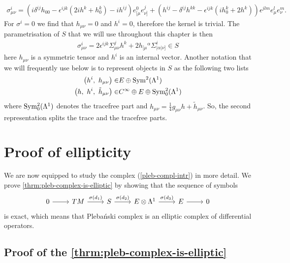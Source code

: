 \documentclass[10pt]{report}
\newcommand{\pleb}[0]{Pleba\'nski}
\theoremstyle{definition}
\begin{document}
\begin{align}
    \sigma^i_{\mu\nu} = \left( i \delta^{ij} h_{00} - \epsilon^{ijk}(2i h^k + h^k_0) - i h^{i j} \right) e^0_{[\mu} e^j_{\nu]} + \left( h^{ij} - \delta^{ij} h^{kk} - \epsilon^{ijk}(i h^k_0 + 2 h^k)\right) \epsilon^{jlm} e^l_\mu e^m_\nu.
\end{align}
For $\sigma^i = 0$ we find that $h_{\mu\nu} = 0$ and $h^i = 0$, therefore the kernel is trivial. The parametrisation of $S$ that we will use throughout this chapter is then
\begin{align}\label{param-sigma}
    \sigma^i_{\mu\nu} =  2 \epsilon^{ijk} \Sigma^j_{\mu\nu} h^k + 2 h_{[\mu}{}^\alpha \Sigma^i_{|\alpha|\nu]} \in S
\end{align}
here $h_{\mu\nu}$ is a symmetric tensor and $h^i$ is an internal vector. Another notation that we will frequently use below is to represent objects in $S$ as the following two lists
\begin{align}
\left( h^i,\ h_{\mu\nu} \right) \in& E \oplus \rm Sym^2(\Lambda^1) \\
\left( h,\ h^i,\ \tilde{h}_{\mu\nu} \right) \in& C^\infty \oplus E \oplus \rm Sym^2_0(\Lambda^1)
\end{align}
where $\rm Sym^2_0(\Lambda^1)$ denotes the tracefree part and $h_{\mu\nu} = \frac{1}{4} g_{\mu\nu} h + \tilde{h}_{\mu\nu}$. So, the second representation splits the trace and the tracefree parts. 

\section{Proof of ellipticity}

We are now equipped to study the complex (\ref{pleb-compl-intr}) in more detail. We prove \cref{thrm:pleb-complex-is-elliptic} by showing that the sequence of symbols 
\begin{equation}
\begin{tikzcd}\label{exact-sequence}
0 \arrow{r}{} & TM  \arrow{r}{\sigma(d_1)} & S  \arrow{r}{\sigma(d_2)} & E\otimes \Lambda^1  \arrow{r}{\sigma(d_3)} & E \arrow{r}{} & 0
\end{tikzcd}
\end{equation}
is exact, which means that \pleb{} complex is an elliptic complex of differential operators. 

\subsection{Proof of the \cref{thrm:pleb-complex-is-elliptic}}
\end{document}
